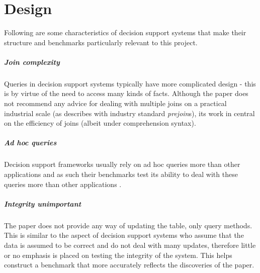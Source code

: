 \section{Design}
Following are some characteristics of decision support systems \cite{IntroToDatabaseSystems} 
that make their structure and benchmarks particularly relevant to this
project.

\subparagraph{Join complexity} Queries in decision support systems typically
have more complicated design - this is by virtue of the need to access many
kinds of facts. Although the paper \cite{RelationalAlgebraByWayOfAdjunctions}
does not recommend any advice for dealing with multiple joins on a practical
industrial scale (as \cite{IntroToDatabaseSystems} describes with industry
standard \emph{prejoin}s), its work in central on the efficiency of joins
(albeit under comprehension syntax).

\subparagraph{Ad hoc queries} Decision support frameworks usually rely on ad hoc
queries more than other applications and as such their benchmarks test its
ability to deal with these queries more than other applications
\cite{SetQueryBenchmark, PractitionersIntroduction}.

\subparagraph{Integrity unimportant} The paper does not provide any way of
updating the table, only query methods. This is similar to the aspect of
decision support systems who assume that the data is assumed to be correct and
do not deal with many updates, therefore little or no emphasis is placed on
testing the integrity of the system. This helps construct a benchmark that more
accurately reflects the discoveries of the paper.

